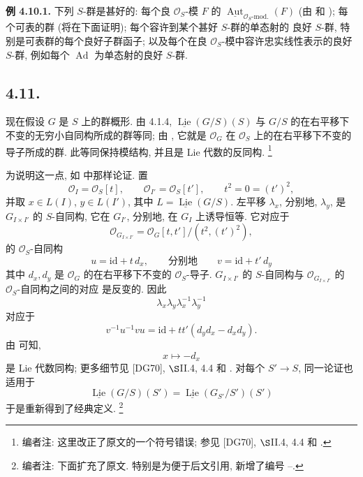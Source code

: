 \medskip
\noindent{}\textbf{例 4.10.1.}
下列 \(S\)-群是甚好的:
每个良 \(\mathcal O_S\)-模 \(F\) 的
\(\underline{\operatorname{Aut}}_{\mathcal O_S\text{-mod.}}(F)\)
(由  和 );
每个可表的群 (将在下面证明); 每个容许到某个甚好 \(S\)-群的单态射的
良好 \(S\)-群, 特别是可表群的每个良好子群函子; 以及每个在良
\(\mathcal O_S\)-模中容许忠实线性表示的良好 \(S\)-群,
例如每个 \(\operatorname{Ad}\) 为单态射的良好 \(S\)-群.

\subsection*{4.11.}
现在假设 \(G\) 是 \(S\) 上的群概形. 由 4.1.4,
\(\underline{\operatorname{Lie}}(G/S)(S)\) 与 \(G/S\)
的在右平移下不变的无穷小自同构所成的群等同;
由 , 它就是
\(\mathcal O_G\) 在 \(\mathcal O_S\) 上的在右平移下不变的导子所成的群.
此等同保持模结构, 并且是 Lie 代数的反同构.
\footnote{编者注: 这里改正了原文的一个符号错误;
参见 [DG70], \(\S\)II.4, 4.4 和 .}

为说明这一点, 如  中那样论证. 置
\[
 \mathcal O_I=\mathcal O_S[t],
 \qquad
 \mathcal O_{I'}=\mathcal O_S[t'],
 \qquad
 t^2=0=(t')^2,
\]
并取 \(x\in L(I)\), \(y\in L(I')\), 其中
\(L=\underline{\operatorname{Lie}}(G/S)\). 左平移
\(\lambda_x\), 分别地, \(\lambda_y\), 是
\(G_{I\times I'}\) 的 \(S\)-自同构, 它在 \(G_{I'}\),
分别地, 在 \(G_I\) 上诱导恒等. 它对应于
\[
 \mathcal O_{G_{I\times I'}}
 =\mathcal O_G[t,t']/(t^2,(t')^2),
\]
的 \(\mathcal O_S\)-自同构
\[
 u=\mathrm{id}+t\,d_x,
 \qquad\text{分别地}\qquad
 v=\mathrm{id}+t'\,d_y
\]
其中 \(d_x,d_y\) 是 \(\mathcal O_G\) 的在右平移下不变的
\(\mathcal O_S\)-导子. \(G_{I\times I'}\) 的 \(S\)-自同构与
\(\mathcal O_{G_{I\times I'}}\) 的 \(\mathcal O_S\)-自同构之间的对应
是反变的. 因此
\[
 \lambda_x\lambda_y\lambda_x^{-1}\lambda_y^{-1}
\]
对应于
\[
 v^{-1}u^{-1}vu
 =\mathrm{id}+tt'(d_yd_x-d_xd_y).
\]
由  可知,
\[
 x\longmapsto-d_x
\]
是 Lie 代数同构; 更多细节见 [DG70],
\(\S\)II.4, 4.4 和 .
对每个 \(S'\to S\), 同一论证也适用于
\[
 \underline{\operatorname{Lie}}(G/S)(S')
 =
 \underline{\operatorname{Lie}}(G_{S'}/S')(S')
\]
于是重新得到了经典定义.
\footnote{编者注: 下面扩充了原文. 特别是为便于后文引用,
新增了编号 --.}

